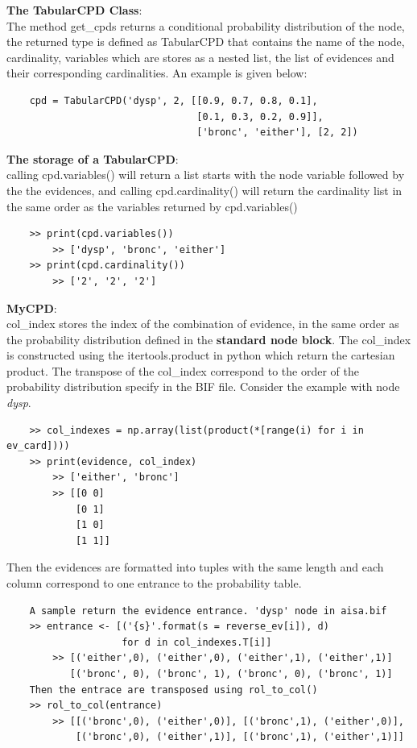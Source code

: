     \textbf{The TabularCPD Class}:\\
    The method get\_cpds returns a conditional probability distribution of the node, the returned type is defined as TabularCPD that contains the name of the node, cardinality, variables which are stores as a nested list, the list of evidences and their corresponding cardinalities. An example is given below:
    \begin{lstlisting}
    cpd = TabularCPD('dysp', 2, [[0.9, 0.7, 0.8, 0.1],
                                 [0.1, 0.3, 0.2, 0.9]],
                                 ['bronc', 'either'], [2, 2])
    \end{lstlisting}

    \textbf{The storage of a TabularCPD}:\\
    calling cpd.variables() will return a list starts with the node variable followed by the the evidences, and calling cpd.cardinality() will return the cardinality list in the same order as the variables returned by cpd.variables()
    \begin{lstlisting}
    >> print(cpd.variables())
        >> ['dysp', 'bronc', 'either']
    >> print(cpd.cardinality())
        >> ['2', '2', '2']
    \end{lstlisting}

    \textbf{MyCPD}:\\
    col\_index stores the index of the combination of evidence, in the same order as the probability distribution defined in the \textbf{standard node block}. The col\_index is constructed using the itertools.product in python which return the cartesian product. The transpose of the col\_index correspond to the order of the probability distribution specify in the BIF file. Consider the example with node \textit{dysp}.
    \begin{lstlisting}
    >> col_indexes = np.array(list(product(*[range(i) for i in ev_card])))
    >> print(evidence, col_index) 
        >> ['either', 'bronc']
        >> [[0 0]
            [0 1]
            [1 0]
            [1 1]]
    \end{lstlisting}
   
    Then the evidences are formatted into tuples with the same length and each column correspond to one entrance to the probability table.\\
    \begin{lstlisting}
    A sample return the evidence entrance. 'dysp' node in aisa.bif
    >> entrance <- [('{s}'.format(s = reverse_ev[i]), d) 
                    for d in col_indexes.T[i]]
        >> [('either',0), ('either',0), ('either',1), ('either',1)]
           [('bronc', 0), ('bronc', 1), ('bronc', 0), ('bronc', 1)]
    Then the entrace are transposed using rol_to_col()
    >> rol_to_col(entrance)
        >> [[('bronc',0), ('either',0)], [('bronc',1), ('either',0)], 
            [('bronc',0), ('either',1)], [('bronc',1), ('either',1)]]
    \end{lstlisting}
    
